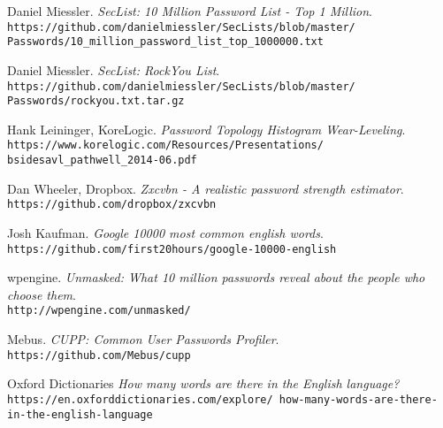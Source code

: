 \documentclass[11pt, a4paper]{article}
\begin{document}
\begin{thebibliography}{99}
Daniel Miessler.
\textit{SecList: 10 Million Password List - Top 1 Million}.
\\\texttt{https://github.com/danielmiessler/SecLists/blob/master/ Passwords/10\_million\_password\_list\_top\_1000000.txt}

Daniel Miessler.
\textit{SecList: RockYou List}.
\\\texttt{https://github.com/danielmiessler/SecLists/blob/master/
Passwords/rockyou.txt.tar.gz}

Hank Leininger, KoreLogic.
\textit{Password Topology Histogram Wear-Leveling}.
\\\texttt{https://www.korelogic.com/Resources/Presentations/
bsidesavl\_pathwell\_2014-06.pdf}

Dan Wheeler, Dropbox.
\textit{Zxcvbn - A realistic password strength estimator}.
\\\texttt{https://github.com/dropbox/zxcvbn}

Josh Kaufman.
\textit{Google 10000 most common english words}.
\\\texttt{https://github.com/first20hours/google-10000-english}

wpengine.
\textit{Unmasked: What 10 million passwords reveal about the people who choose them}.
\\\texttt{http://wpengine.com/unmasked/}

Mebus.
\textit{CUPP: Common User Passwords Profiler}.
\\\texttt{https://github.com/Mebus/cupp}

Oxford Dictionaries
\textit{How many words are there in the English language?}
\\\texttt{https://en.oxforddictionaries.com/explore/
how-many-words-are-there-in-the-english-language}


\end{thebibliography}
\end{document}
